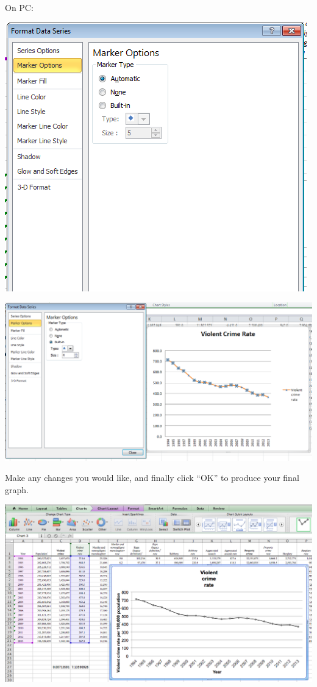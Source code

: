 \documentclass[
]{book}
\begin{document}
On PC:

\includegraphics{imgs/pc_line_1.png}

\includegraphics{imgs/pc_edit_marker.png}

Make any changes you would like, and finally click ``OK'' to produce your final graph.

\includegraphics{imgs/desc_line_final.png}
\end{document}
